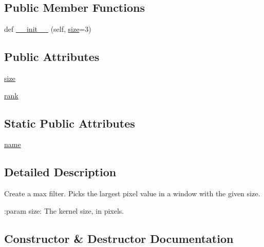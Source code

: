 \subsection*{Public Member Functions}
\begin{DoxyCompactItemize}
\item 
def \hyperlink{classPIL_1_1ImageFilter_1_1MaxFilter_a79cc5476414c2d123c97298ee5735e52}{\+\_\+\+\_\+init\+\_\+\+\_\+} (self, \hyperlink{classPIL_1_1ImageFilter_1_1MaxFilter_aa4ba036196bdd75f033a40ab38120f30}{size}=3)
\end{DoxyCompactItemize}
\subsection*{Public Attributes}
\begin{DoxyCompactItemize}
\item 
\hyperlink{classPIL_1_1ImageFilter_1_1MaxFilter_aa4ba036196bdd75f033a40ab38120f30}{size}
\item 
\hyperlink{classPIL_1_1ImageFilter_1_1MaxFilter_aceab7fdf5bd2abd9463e7c9139ea7869}{rank}
\end{DoxyCompactItemize}
\subsection*{Static Public Attributes}
\begin{DoxyCompactItemize}
\item 
\hyperlink{classPIL_1_1ImageFilter_1_1MaxFilter_adaf0813c8a91a6fdcb35afccff6ba568}{name}
\end{DoxyCompactItemize}


\subsection{Detailed Description}
\begin{DoxyVerb}Create a max filter.  Picks the largest pixel value in a window with the
given size.

:param size: The kernel size, in pixels.
\end{DoxyVerb}
 

\subsection{Constructor \& Destructor Documentation}
\mbox{\label{classPIL_1_1ImageFilter_1_1MaxFilter_a79cc5476414c2d123c97298ee5735e52}} 
